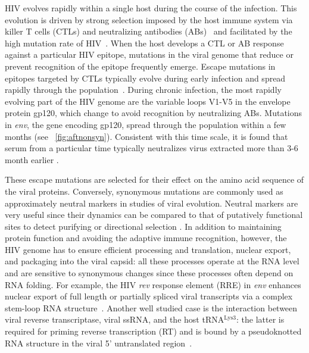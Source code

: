 \documentclass[rmp, twocolumn]{revtex4}
\newcommand{\rev}{\textit{rev}}
\newcommand{\env}{\textit{env}}
\begin{document}
HIV evolves rapidly within a single host during the course of the infection.
This evolution is driven by strong selection imposed by the host immune system
via killer T cells (CTLs) and neutralizing antibodies
(ABs)~\citep{rambaut_causes_2004} and facilitated by the high mutation rate of
HIV~\citep{mansky_lower_1995,abram_nature_2010}. When the host develops a CTL or
AB response against a particular HIV epitope, mutations in the viral genome that
reduce or prevent recognition of the epitope frequently emerge. Escape mutations
in epitopes targeted by CTLs typically evolve during early infection and spread
rapidly through the population~\citep{mcmichael_immune_2009}. During chronic
infection, the most rapidly evolving part of the HIV genome are the variable
loops V1-V5 in the envelope protein gp120, which change to avoid recognition by
neutralizing ABs. Mutations in \env, the gene encoding gp120, spread through the
population within a few months (see \figurename~\ref{fig:aftnonsyn}).
Consistent with this time scale, it is found that serum from a particular time
typically neutralizes virus extracted more than 3-6 month earlier
\citep{richman_rapid_2003}.

These escape mutations are selected for their effect on the amino acid sequence
of the viral proteins. Conversely, synonymous mutations are commonly used as
approximately neutral markers in studies of viral evolution. Neutral markers are
very useful since their dynamics can be compared to that of putatively
functional sites to detect purifying or directional selection
\citep{Bhatt:2011p43255,Hurst:2002p32608,Chen:2004p22606}. In addition to
maintaining protein function and avoiding the adaptive immune recognition,
however, the HIV genome has to ensure efficient processing and translation,
nuclear export, and packaging into the viral capsid: all these processes operate
at the RNA level and are sensitive to synonymous changes since these processes
often depend on RNA folding. For example, the HIV \rev{} response element (RRE)
in \env{} enhances nuclear export of full length or partially spliced viral
transcripts via a complex stem-loop RNA structure~\citep{fernandes_hiv-1_2012}.
Another well studied case is the interaction between viral reverse
transcriptase, viral ssRNA, and the host tRNA$^\text{Lys3}$: the latter is
required for priming reverse transcription (RT) and is bound by a pseudoknotted
RNA structure in the viral 5' untranslated region~\citep{barat_interaction_1991,
paillart_vitro_2002}.
\end{document}
